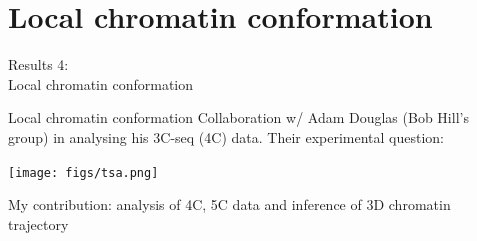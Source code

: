 \documentclass{beamer}
\begin{document}
\section{Local chromatin conformation}
{
\begin{frame}{}
\begin{tcolorbox}[colback=blue!40!black,colframe=blue!40!black]
\begin{center}
{
{\small Results 4: } \\
Local chromatin conformation }
\end{center}
\end{tcolorbox}
\end{frame}
}


\begin{frame}{Local chromatin conformation}
Collaboration w/ Adam Douglas (Bob Hill's group) in analysing his
3C-seq (4C) data. Their experimental question: \\

\vspace{1em}

\centerline{
\texttt{[image: figs/tsa.png]}
}

My contribution: analysis of 4C, 5C data and inference of 3D chromatin trajectory

\end{frame}
\end{document}
